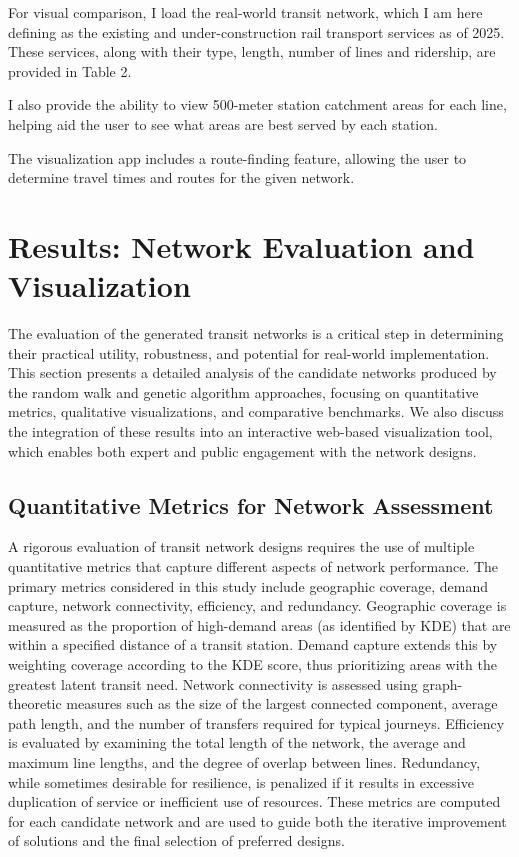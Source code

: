 \documentclass[manuscript,screen,review]{acmart}
\begin{document}
For visual comparison, I load the real-world transit network, which I am here defining as the existing and under-construction rail transport services as of 2025. These services, along with their type, length, number of lines and ridership, are provided in Table 2. 

I also provide the ability to view 500-meter station catchment areas for each line, helping aid the user to see what areas are best served by each station.

The visualization app includes a route-finding feature, allowing the user to determine travel times and routes for the given network. 

\section{Results: Network Evaluation and Visualization}

The evaluation of the generated transit networks is a critical step in determining their practical utility, robustness, and potential for real-world implementation. This section presents a detailed analysis of the candidate networks produced by the random walk and genetic algorithm approaches, focusing on quantitative metrics, qualitative visualizations, and comparative benchmarks. We also discuss the integration of these results into an interactive web-based visualization tool, which enables both expert and public engagement with the network designs.

\subsection{Quantitative Metrics for Network Assessment}
A rigorous evaluation of transit network designs requires the use of multiple quantitative metrics that capture different aspects of network performance. The primary metrics considered in this study include geographic coverage, demand capture, network connectivity, efficiency, and redundancy. Geographic coverage is measured as the proportion of high-demand areas (as identified by KDE) that are within a specified distance of a transit station. Demand capture extends this by weighting coverage according to the KDE score, thus prioritizing areas with the greatest latent transit need. Network connectivity is assessed using graph-theoretic measures such as the size of the largest connected component, average path length, and the number of transfers required for typical journeys. Efficiency is evaluated by examining the total length of the network, the average and maximum line lengths, and the degree of overlap between lines. Redundancy, while sometimes desirable for resilience, is penalized if it results in excessive duplication of service or inefficient use of resources. These metrics are computed for each candidate network and are used to guide both the iterative improvement of solutions and the final selection of preferred designs.
\end{document}
